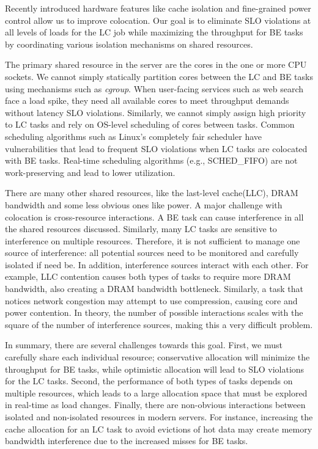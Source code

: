 \begin{bigabstract}
Recently introduced hardware features like cache isolation and fine-grained power control allow us to improve colocation. Our goal is to eliminate SLO violations at all levels of loads for the LC job while maximizing the throughput for BE tasks by coordinating various isolation mechanisms on shared resources.

The primary shared resource in the server are the cores in the one or more CPU sockets. We cannot simply statically partition cores between the LC and BE tasks using mechanisms such as \textit{cgroup}. When user-facing services such as web search face a load spike, they need all available cores to meet throughput demands without latency SLO violations. Similarly, we cannot simply assign high priority to LC tasks and rely on OS-level scheduling of cores between tasks. Common scheduling algorithms such as Linux’s completely fair scheduler have vulnerabilities that lead to frequent SLO violations when LC tasks are colocated with BE tasks. Real-time scheduling algorithms (e.g., SCHED\_FIFO) are not work-preserving and lead to lower utilization. 

There are many other shared resources, like the last-level cache(LLC), DRAM bandwidth and some less obvious ones like power. A major challenge with colocation is cross-resource interactions. A BE task can cause interference in all the shared resources discussed. Similarly, many LC tasks are sensitive to interference on multiple resources. Therefore, it is not sufficient to manage one source of interference: all potential sources need to be monitored and carefully isolated if need be. In addition, interference sources interact with each other. For example, LLC contention causes both types of tasks to require more DRAM bandwidth, also creating a DRAM bandwidth bottleneck. Similarly, a task that notices network congestion may attempt to use compression, causing core and power contention. In theory, the number of possible interactions scales with the square of the number of interference sources, making this a very difficult problem.

In summary, there are several challenges towards this goal. First, we must carefully share each individual resource; conservative allocation will minimize the throughput for BE tasks, while optimistic allocation will lead to SLO violations for the LC tasks. Second, the performance of both types of tasks depends on multiple resources, which leads to a large allocation space that must be explored in real-time as load changes. Finally, there are non-obvious interactions between isolated and non-isolated resources in modern servers. For instance, increasing the cache allocation for an LC task to avoid evictions of hot data may create memory bandwidth interference due to the increased misses for BE tasks.


\end{bigabstract}
